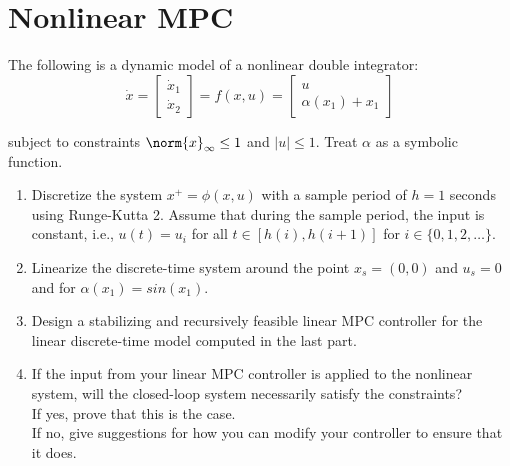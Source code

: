\setcounter{section}{0}
\section{Nonlinear MPC}

The following is a dynamic model of a nonlinear double integrator:
\begin{equation*}
    \dot{x} = \begin{bmatrix}
        \dot{x}_1 \\
        \dot{x}_2
    \end{bmatrix} = f(x,u) = \begin{bmatrix}
        u \\
        \alpha(x_1) + x_1
    \end{bmatrix}
\end{equation*}

subject to constraints $\norm{x}_{\infty} \leq 1$ and $|u| \leq 1$. Treat $\alpha$ as a symbolic function.

\begin{enumerate}
    \item Discretize the system $x^+ = \phi(x,u)$ with a sample period of $h = 1$ seconds using Runge-Kutta 2. Assume that during the sample period, the input is constant, i.e., $u(t) = u_i$ for all $t \in [h(i),h(i+ 1)]$ for $i \in \{0,1,2, \dots \}$. 
    \item Linearize the discrete-time system around the point $x_s = (0,0)$ and $u_s = 0$ and for $\alpha(x_1) = sin(x_1)$. 
    \item Design a stabilizing and recursively feasible linear MPC controller for the linear discrete-time model computed in the last part.
    \item If the input from your linear MPC controller is applied to the nonlinear system, will the closed-loop system necessarily satisfy the constraints? \\
    If yes, prove that this is the case. \\
    If no, give suggestions for how you can modify your controller to ensure that it does.
\end{enumerate}


